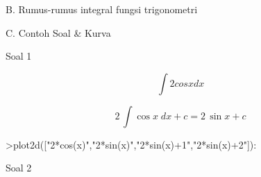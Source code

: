 \documentclass[a4paper,10pt]{article}
\begin{document}
\begin{eulernotebook}
\begin{eulercomment}
\end{eulercomment}
\begin{eulerttcomment}
        B. Rumus-rumus integral fungsi trigonometri
\end{eulerttcomment}
\begin{eulercomment}

\end{eulercomment}
\begin{eulercomment}

\end{eulercomment}
\begin{eulerttcomment}
        C. Contoh Soal & Kurva
\end{eulerttcomment}
\begin{eulercomment}
Soal 1

\end{eulercomment}
\begin{eulerformula}
\[
\int 2 cos x dx
\]
\end{eulerformula}
\begin{eulerformula}
\[
2\,\int {\cos x}{\;dx}+c=2\,\sin x+c
\]
\end{eulerformula}
\begin{eulerprompt}
>plot2d(["2*cos(x)","2*sin(x)","2*sin(x)+1","2*sin(x)+2"]):
\end{eulerprompt}
\begin{eulercomment}
Soal 2


\end{eulercomment}
\end{eulernotebook}
\end{document}
